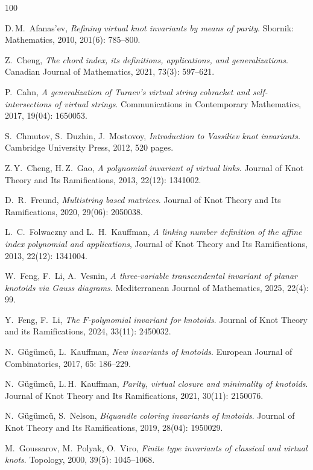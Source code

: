 \documentclass[12pt]{amsart}
\theoremstyle{noparens}
\numberwithin{equation}{section}
\numberwithin{equation}{section}
\begin{document}
\begin{thebibliography}{100}

D.\,M.~Afanas'ev, \textit{Refining virtual knot invariants by means of parity}. Sbornik: Mathematics, 2010, 201(6): 785--800.	

Z.~Cheng, \textit{The chord index, its definitions, applications, and generalizations}. Canadian Journal of Mathematics, 2021, 73(3): 597--621.

P.~Cahn, \textit{A generalization of Turaev’s virtual string cobracket and self-intersections of virtual strings}. Communications in Contemporary Mathematics, 2017, 19(04): 1650053.

S.~Chmutov, S.~Duzhin, J.~Mostovoy, \textit{Introduction to Vassiliev knot invariants.} Cambridge University Press, 2012, 520 pages.

Z.\,Y.~Cheng, H.\,Z.~Gao, \textit{A polynomial invariant of virtual links}. Journal of Knot Theory and Its Ramifications, 2013, 22(12): 1341002.

D.~R.~Freund, \textit{Multistring based matrices}. Journal of Knot Theory and Its Ramifications, 2020, 29(06): 2050038.

L.~C.~Folwaczny and L.~H.~Kauffman, \textit{A linking number definition of the affine index polynomial and applications}, Journal of Knot Theory and Its Ramifications, 2013, 22(12): 1341004.

W.~Feng, F.~Li, A.~Vesnin, \textit{A three-variable transcendental invariant of planar knotoids via Gauss diagrams}. Mediterranean Journal of Mathematics, 2025, 22(4): 99.

Y.~Feng, F.~Li, \textit{The $F$-polynomial invariant for knotoids}. Journal of Knot Theory and its Ramifications, 2024, 33(11): 2450032.	

N.~G\"{u}g\"{u}mc\"{u}, L.~Kauffman, \textit{New invariants of knotoids}. European Journal of Combinatorics, 2017, 65: 186--229.

N.~G\"{u}g\"{u}mc\"{u}, L.\,H.~Kauffman, \textit{Parity, virtual closure and minimality of knotoids}. Journal of Knot Theory and Its Ramifications, 2021, 30(11): 2150076.

N.~G\"{u}g\"{u}mc\"{u}, S.~Nelson, \textit{Biquandle coloring invariants of knotoids}. Journal of Knot Theory and Its Ramifications, 2019, 28(04): 1950029.

M.~Goussarov, M.~Polyak, O.~Viro, \textit{Finite type invariants of classical and virtual knots}. Topology, 2000, 39(5): 1045--1068.


\end{thebibliography}
\end{document}
